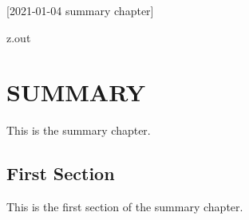 [2021-01-04 summary chapter]

\begin{VerbatimOut}{z.out}
\chapter{SUMMARY}

This is the summary chapter.


\section{First Section}

This is the first section of the summary chapter.
\end{VerbatimOut}

\MyIO
